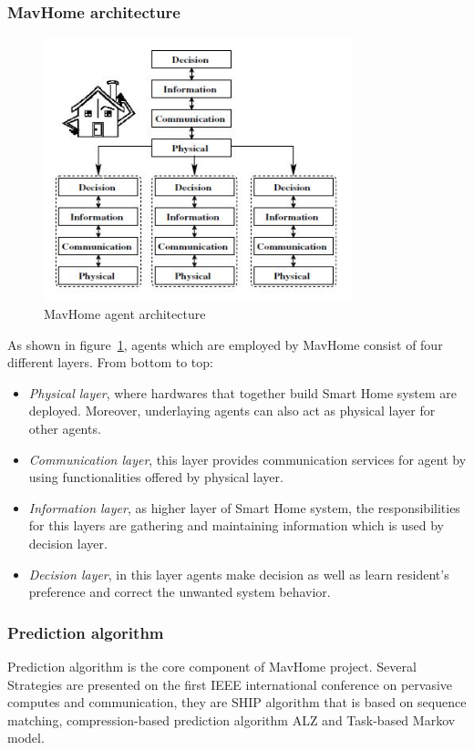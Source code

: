 \subsubsection{MavHome architecture}
 \begin{figure}[!htbp]
	\centering
	\includegraphics[width=0.8\textwidth]{smart-home-agent.jpg}
		\caption{MavHome agent architecture\cite{smart_home_agent}}
	\label{fig:smart-home-agent}
\end{figure}
As shown in figure~\ref{fig:smart-home-agent}, agents which are employed by MavHome consist of four different layers. From bottom to top:
\begin{itemize}
\item \emph{Physical layer}, where hardwares that together build Smart Home system are deployed. Moreover, underlaying agents can also act as physical layer for other agents.
\item \emph{Communication layer}, this layer provides communication services for agent by using functionalities offered by physical layer.
\item \emph{Information layer}, as higher layer of Smart Home system,  the responsibilities for this layers are gathering and maintaining information which is used by decision layer.
\item \emph{Decision layer}, in this layer agents make decision as well as learn resident's preference and correct the unwanted system behavior.
\end{itemize}
\subsubsection{Prediction algorithm}
Prediction algorithm is the core component of MavHome project. Several Strategies are presented on the first IEEE international conference on pervasive computes and communication, they are SHIP algorithm that is based on sequence matching, compression-based prediction algorithm ALZ and Task-based Markov model\cite{smart_home_agent}.

